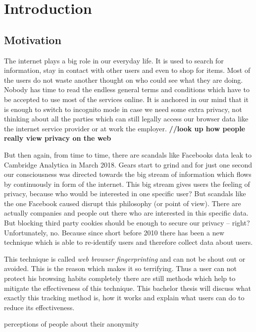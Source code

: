 \chapter{Introduction}
\label{cha:Introduction}

\section{Motivation}

The internet plays a big role in our everyday life. It is used to search for information, stay in contact with other users and even to shop for items. Most of the users do not waste another thought on who could see what they are doing. Nobody has time to read the endless general terms and conditions which have to be accepted to use most of the services online. It is anchored in our mind that it is enough to switch to incognito mode in case we need some extra privacy, not thinking about all the parties which can still legally access our browser data like the internet service provider or at work the employer.
\textbf{//look up how people really view privacy on the web}

But then again, from time to time, there are scandals like Facebooks data leak to Cambridge Analytica in March 2018. Gears start to grind and for just one second our consciousness was directed towards the big stream of information which flows by continuously in form of the internet. This big stream gives users the feeling of privacy, because who would be interested in one specific user? But scandals like the one Facebook caused disrupt this philosophy (or point of view). There are actually companies and people out there who are interested in this specific data. But blocking third party cookies should be enough to secure our privacy – right? Unfortunately, no. Because since short before 2010 there has been a new technique which is able to re-identify users and therefore collect data about users. 

This technique is called \textit{web browser fingerprinting} and can not be shout out or avoided. This is the reason which makes it so terrifying. Thus a user can not protect his browsing habits completely there are still methods which help to mitigate the effectiveness of this technique.
This bachelor thesis will discuss what exactly this tracking method is, how it works and explain what users can do to reduce its effectiveness. 



perceptions of people about their anonymity


